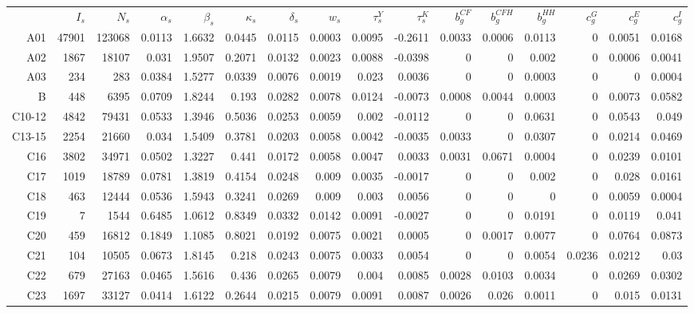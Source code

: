 \begin{table}
\centering
\begin{tabular}{rrrrrrrrrrrrrrrr}
 & $I_s$ & $N_{s}$ & $\alpha_s$ & $\beta_s$ & $\kappa_s$ & $\delta_s$ & $w_s$ & $\tau^{Y}_{s}$ & $\tau^{K}_{s}$ & $b^{CF}_g$ & $b^{CFH}_{g}$ & $b^{HH}_{g}$  & $c^{G}_g$ & $c^{E}_g$ & $c^{I}_g$ \\
A01 & 47901 & 123068 & 0.0113 & 1.6632 & 0.0445 & 0.0115 & 0.0003 & 0.0095 & -0.2611 & 0.0033 & 0.0006 & 0.0113 & 0 & 0.0051 & 0.0168 \\
A02 & 1867 & 18107 & 0.031 & 1.9507 & 0.2071 & 0.0132 & 0.0023 & 0.0088 & -0.0398 & 0 & 0 & 0.002 & 0 & 0.0006 & 0.0041 \\
A03 & 234 & 283 & 0.0384 & 1.5277 & 0.0339 & 0.0076 & 0.0019 & 0.023 & 0.0036 & 0 & 0 & 0.0003 & 0 & 0 & 0.0004 \\
B & 448 & 6395 & 0.0709 & 1.8244 & 0.193 & 0.0282 & 0.0078 & 0.0124 & -0.0073 & 0.0008 & 0.0044 & 0.0003 & 0 & 0.0073 & 0.0582 \\
C10-12 & 4842 & 79431 & 0.0533 & 1.3946 & 0.5036 & 0.0253 & 0.0059 & 0.002 & -0.0112 & 0 & 0 & 0.0631 & 0 & 0.0543 & 0.049 \\
C13-15 & 2254 & 21660 & 0.034 & 1.5409 & 0.3781 & 0.0203 & 0.0058 & 0.0042 & -0.0035 & 0.0033 & 0 & 0.0307 & 0 & 0.0214 & 0.0469 \\
C16 & 3802 & 34971 & 0.0502 & 1.3227 & 0.441 & 0.0172 & 0.0058 & 0.0047 & 0.0033 & 0.0031 & 0.0671 & 0.0004 & 0 & 0.0239 & 0.0101 \\
C17 & 1019 & 18789 & 0.0781 & 1.3819 & 0.4154 & 0.0248 & 0.009 & 0.0035 & -0.0017 & 0 & 0 & 0.002 & 0 & 0.028 & 0.0161 \\
C18 & 463 & 12444 & 0.0536 & 1.5943 & 0.3241 & 0.0269 & 0.009 & 0.003 & 0.0056 & 0 & 0 & 0 & 0 & 0.0059 & 0.0004 \\
C19 & 7 & 1544 & 0.6485 & 1.0612 & 0.8349 & 0.0332 & 0.0142 & 0.0091 & -0.0027 & 0 & 0 & 0.0191 & 0 & 0.0119 & 0.041 \\
C20 & 459 & 16812 & 0.1849 & 1.1085 & 0.8021 & 0.0192 & 0.0075 & 0.0021 & 0.0005 & 0 & 0.0017 & 0.0077 & 0 & 0.0764 & 0.0873 \\
C21 & 104 & 10505 & 0.0673 & 1.8145 & 0.218 & 0.0243 & 0.0075 & 0.0033 & 0.0054 & 0 & 0 & 0.0054 & 0.0236 & 0.0212 & 0.03 \\
C22 & 679 & 27163 & 0.0465 & 1.5616 & 0.436 & 0.0265 & 0.0079 & 0.004 & 0.0085 & 0.0028 & 0.0103 & 0.0034 & 0 & 0.0269 & 0.0302 \\
C23 & 1697 & 33127 & 0.0414 & 1.6122 & 0.2644 & 0.0215 & 0.0079 & 0.0091 & 0.0087 & 0.0026 & 0.026 & 0.0011 & 0 & 0.015 & 0.0131 \\

\end{tabular}
\end{table}
